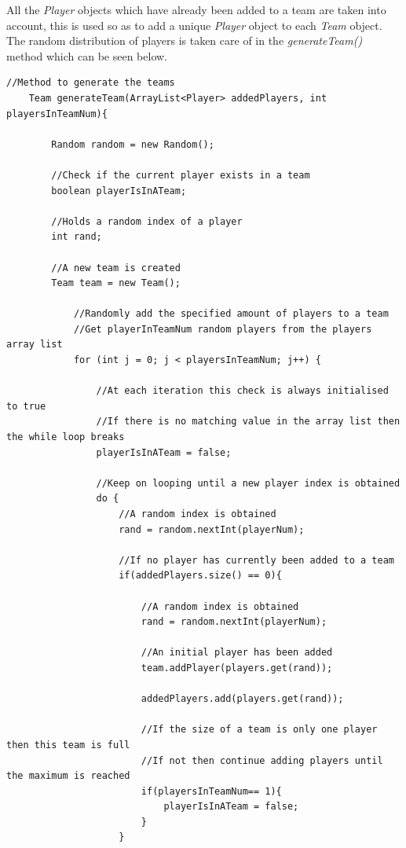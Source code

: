 \documentclass[a4paper,12pt]{extarticle}
\begin{document}
\noindent All the \textit{Player} objects which have already been added to a team are taken into account, this is used so as to add a unique \textit{Player} object to each \textit{Team} object. The random distribution of players is taken care of in the \textit{generateTeam()} method which can be seen below.\\

\newpage
\begin{lstlisting}
//Method to generate the teams
    Team generateTeam(ArrayList<Player> addedPlayers, int playersInTeamNum){

        Random random = new Random();

        //Check if the current player exists in a team
        boolean playerIsInATeam;

        //Holds a random index of a player
        int rand;

        //A new team is created
        Team team = new Team();

            //Randomly add the specified amount of players to a team
            //Get playerInTeamNum random players from the players array list
            for (int j = 0; j < playersInTeamNum; j++) {

                //At each iteration this check is always initialised to true
                //If there is no matching value in the array list then the while loop breaks
                playerIsInATeam = false;

                //Keep on looping until a new player index is obtained
                do {
                    //A random index is obtained
                    rand = random.nextInt(playerNum);

                    //If no player has currently been added to a team
                    if(addedPlayers.size() == 0){

                        //A random index is obtained
                        rand = random.nextInt(playerNum);

                        //An initial player has been added
                        team.addPlayer(players.get(rand));

                        addedPlayers.add(players.get(rand));

                        //If the size of a team is only one player then this team is full
                        //If not then continue adding players until the maximum is reached
                        if(playersInTeamNum== 1){
                            playerIsInATeam = false;
                        }
                    }


\end{lstlisting}
\end{document}
